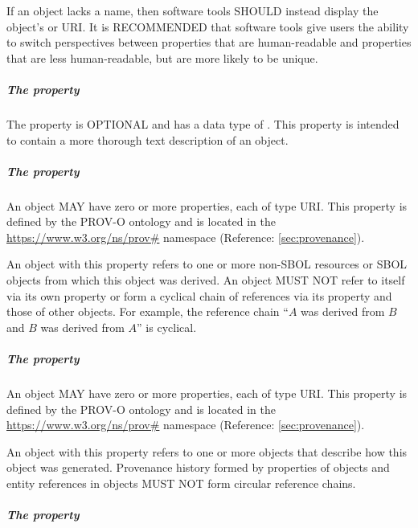 If an  object lacks a name, then software tools SHOULD instead display the object's  or URI.
It is RECOMMENDED that software tools give users the ability to switch perspectives between  properties that are human-readable and  properties that are less human-readable, but are more likely to be unique.

\subparagraph{The  property}
\label{sec:description}

The  property is OPTIONAL and has a data type of . This property is intended to contain a more thorough text description of an  object.

\subparagraph{The  property}
\label{sec:prov:wasDerivedFrom}
An  object MAY have zero or more  properties, each of type URI. This property is defined by the PROV-O ontology and is located in the \url{https://www.w3.org/ns/prov#} namespace (Reference: \ref{sec:provenance}).

An  object with this property refers to one or more non-SBOL resources or SBOL  objects from which this object was derived. 
 An  object MUST NOT refer to itself via its own  property or form a cyclical chain of references via its  property and those of other  objects. For example, the reference chain ``$A$ was derived from $B$ and $B$ was derived from $A$'' is cyclical.

\subparagraph{The  property}
\label{sec:prov:wasGeneratedBy}
An  object MAY have zero or more  properties, each of type URI. This property is defined by the PROV-O ontology and is located in the \url{https://www.w3.org/ns/prov#} namespace (Reference: \ref{sec:provenance}).

An  object with this property refers to one or more  objects that describe how this object was generated.
Provenance history formed by  properties of  objects and entity references in  objects MUST NOT form circular reference chains.

\subparagraph{The  property}
\label{sec:hasMeasure}

